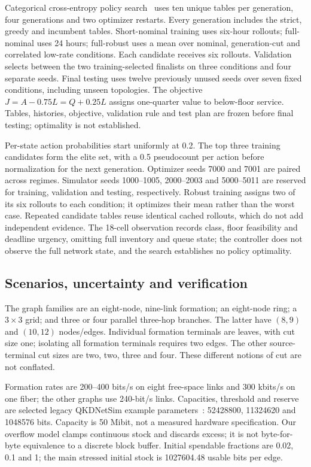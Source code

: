 \documentclass[conference,a4paper]{IEEEtran}
\begin{document}
Categorical cross-entropy policy search~\cite{cem} uses ten unique tables per generation, four generations and two optimizer restarts. Every generation includes the strict, greedy and incumbent tables. Short-nominal training uses six-hour rollouts; full-nominal uses 24 hours; full-robust uses a mean over nominal, generation-cut and correlated low-rate conditions. Each candidate receives six rollouts. Validation selects between the two training-selected finalists on three conditions and four separate seeds. Final testing uses twelve previously unused seeds over seven fixed conditions, including unseen topologies. The objective $J=A-0.75L=Q+0.25L$ assigns one-quarter value to below-floor service. Tables, histories, objective, validation rule and test plan are frozen before final testing; optimality is not established.

Per-state action probabilities start uniformly at 0.2. The top three training candidates form the elite set, with a 0.5 pseudocount per action before normalization for the next generation. Optimizer seeds 7000 and 7001 are paired across regimes. Simulator seeds 1000--1005, 2000--2003 and 5000--5011 are reserved for training, validation and testing, respectively. Robust training assigns two of its six rollouts to each condition; it optimizes their mean rather than the worst case. Repeated candidate tables reuse identical cached rollouts, which do not add independent evidence. The 18-cell observation records class, floor feasibility and deadline urgency, omitting full inventory and queue state; the controller does not observe the full network state, and the search establishes no policy optimality.

\subsection{Scenarios, uncertainty and verification}
The graph families are an eight-node, nine-link formation; an eight-node ring; a $3\times3$ grid; and three or four parallel three-hop branches. The latter have $(8,9)$ and $(10,12)$ nodes/edges. Individual formation terminals are leaves, with cut size one; isolating all formation terminals requires two edges. The other source-terminal cut sizes are two, two, three and four. These different notions of cut are not conflated.

Formation rates are 200--400 bits/s on eight free-space links and 300 kbits/s on one fiber; the other graphs use 240-bit/s links. Capacities, threshold and reserve are selected legacy QKDNetSim example parameters~\cite{qkdnetsim}: 52428800, 11324620 and 1048576 bits. Capacity is 50 Mibit, not a measured hardware specification. Our overflow model clamps continuous stock and discards excess; it is not byte-for-byte equivalence to a discrete block buffer. Initial spendable fractions are 0.02, 0.1 and 1; the main stressed initial stock is 1027604.48 usable bits per edge.
\end{document}
